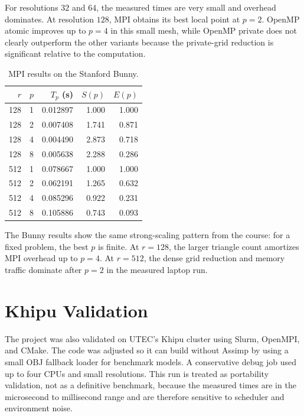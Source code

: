 \documentclass[conference]{IEEEtran}
\begin{document}
For resolutions $32$ and $64$, the measured times are very small and overhead
dominates. At resolution $128$, MPI obtains its best local point at $p=2$.
OpenMP atomic improves up to $p=4$ in this small mesh, while OpenMP private
does not clearly outperform the other variants because the private-grid
reduction is significant relative to the computation.

\begin{table}[t]
  \centering
  \caption{MPI results on the Stanford Bunny.}
  \begin{tabular}{rrrrr}
    \toprule
    $r$ & $p$ & $T_p$ (s) & $S(p)$ & $E(p)$ \\
    \midrule
    128 & 1   & 0.012897  & 1.000  & 1.000  \\
    128 & 2   & 0.007408  & 1.741  & 0.871  \\
    128 & 4   & 0.004490  & 2.873  & 0.718  \\
    128 & 8   & 0.005638  & 2.288  & 0.286  \\
    512 & 1   & 0.078667  & 1.000  & 1.000  \\
    512 & 2   & 0.062191  & 1.265  & 0.632  \\
    512 & 4   & 0.085296  & 0.922  & 0.231  \\
    512 & 8   & 0.105886  & 0.743  & 0.093  \\
    \bottomrule
  \end{tabular}
\end{table}

The Bunny results show the same strong-scaling pattern from the course: for a
fixed problem, the best $p$ is finite. At $r=128$, the larger triangle count
amortizes MPI overhead up to $p=4$. At $r=512$, the dense grid reduction and
memory traffic dominate after $p=2$ in the measured laptop run.

\section{Khipu Validation}

The project was also validated on UTEC's Khipu cluster using Slurm, OpenMPI,
and CMake. The code was adjusted so it can build without Assimp by using a
small OBJ fallback loader for benchmark models. A conservative debug job used
up to four CPUs and small resolutions. This run is treated as portability
validation, not as a definitive benchmark, because the measured times are in
the microsecond to millisecond range and are therefore sensitive to scheduler
and environment noise.
\end{document}
